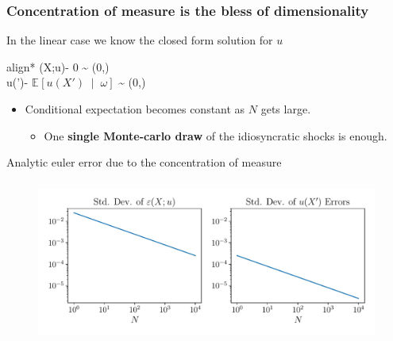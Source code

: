 \documentclass[aspectratio=169,10pt]{beamer}
\newcommand{\emphcolor}[1]{\textbf{\textcolor{emphcolorval}{#1}}}
\newcommand{\condexpec}[3][]{\ensuremath{\mathbb{E}_{#1}\left[{#2} \; \middle| \; {#3} \right]}}
\begin{document}
\begin{frame}[label = errors]
	\frametitle{Concentration of measure is the bless of dimensionality}
	In the linear case we know the closed form solution for $u$
	\begin{empheq}[box=\tcbhighmath]{align*}
		\hat{\varepsilon}\left(X;u\right)- 0 \sim {} \left(0,\right)\\
		u(')- \condexpec{u(X')}{\omega} \sim {} \left(0,\right)
	\end{empheq}
	\begin{itemize}
		\item Conditional expectation becomes constant as $N$ gets large.\vspace{0.1in}
		\begin{itemize}
			\item One \emphcolor{single Monte-carlo draw} of the idiosyncratic shocks is enough.\vspace{0.1in}
			\end{itemize}
	\end{itemize}
\hyperlink{algo}{}
\end{frame}

\begin{frame}{Analytic euler error due to the concentration of measure}
	
	\begin{figure}[h!]
		\centering
		\includegraphics[height = 2.1in]{./figures/concentration_euler_residual_linear.pdf}
	\end{figure}
\end{frame}		

\begin{frame}
	
	\renewcommand{\arraystretch}{1.2}
	\begin{table}[h!]
		\caption{Performance of Different Networks in Solving the Linear Model}\vspace{-0.1in}
		\begin{center}
		\end{center}
	\end{table}
	\renewcommand{\arraystretch}{1.0}
	
\end{frame}	
\end{document}
